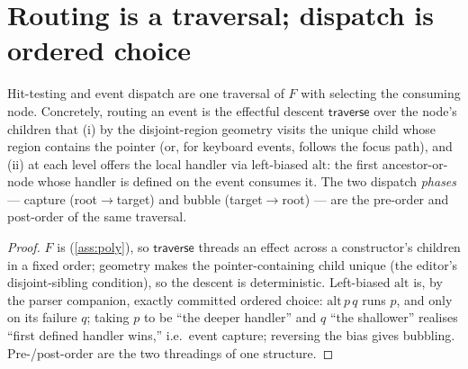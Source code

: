 \documentclass[../uxoxo-main]{subfiles}
\begin{document}

\section{Routing is a traversal; dispatch is ordered choice}\label{sec:routing}
\begin{proposition}\label{prop:routing}
Hit-testing and event dispatch are one  traversal of $F$ with
 selecting the consuming node. Concretely, routing an event is the
effectful descent $\mathsf{traverse}$ over the node's children that (i) by the
disjoint-region geometry visits the unique child whose region contains the pointer
(or, for keyboard events, follows the focus path), and (ii) at each level offers
the local handler via left-biased $\mathrm{alt}$: the first ancestor-or-node whose
handler is defined on the event consumes it. The two dispatch \emph{phases} ---
capture (root$\to$target) and bubble (target$\to$root) --- are the pre-order and
post-order of the same traversal.
\end{proposition}

\begin{proof}
$F$ is  (\cref{ass:poly}), so $\mathsf{traverse}$ threads an
effect across a constructor's children in a fixed order; geometry makes the
pointer-containing child unique (the editor's disjoint-sibling condition), so the
descent is deterministic. Left-biased $\mathrm{alt}$ is, by the parser companion,
exactly committed ordered choice: $\mathrm{alt}\,p\,q$ runs $p$, and only on its
failure $q$; taking $p$ to be ``the deeper handler'' and $q$ ``the shallower''
realises ``first defined handler wins,'' i.e.\ event capture; reversing the bias
gives bubbling. Pre-/post-order are the two threadings of one 
structure.
\end{proof}
\end{document}
